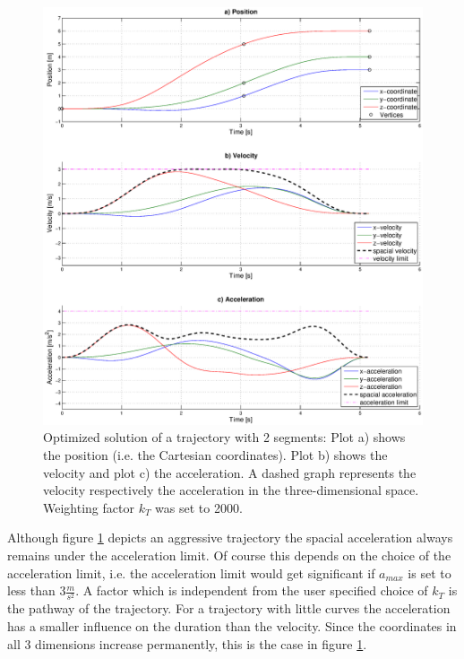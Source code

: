 \begin{figure}[H]
   \centering
   \includegraphics[trim = 33mm 30mm 30mm 15mm,clip,width=1\textwidth]{pics/2SegOpti5s16k2000.eps}
   \caption{Optimized solution of a trajectory with 2 segments: Plot a) shows the position (i.e. the Cartesian coordinates). Plot b) shows the velocity and plot c) the acceleration. A dashed graph represents the velocity respectively the acceleration in the three-dimensional space. Weighting factor $k_T$ was set to 2000.}
   \label{pic:optimizedSolution2k2000}
\end{figure}


Although figure \ref{pic:optimizedSolution2k2000} depicts an aggressive trajectory the spacial acceleration always remains under the acceleration limit. Of course this depends on the choice of the acceleration limit, i.e. the acceleration limit would get significant if $a_{max}$ is set to less than $3 \frac{m}{s^2}$.
A factor which is independent from the user specified choice of $k_T$ is the pathway of the trajectory. For a trajectory with little curves the acceleration has a smaller influence on the duration than the velocity. Since the coordinates in all 3 dimensions increase permanently, this is the case in figure \ref{pic:optimizedSolution2k2000}. \newline



